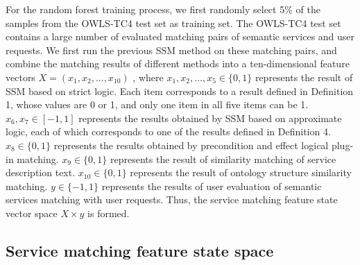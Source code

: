 \documentclass{ieeeaccess}
\begin{document}
For the random forest training process, we first randomly select 5\% of the samples from the OWLS-TC4 test set as training set. The OWLS-TC4 test set contains a large number of evaluated matching pairs of semantic services and user requests. We first run the previous SSM method on these matching pairs, and combine the matching results of different methods into a ten-dimensional feature vectors $X=( {{x}_{1}},{{x}_{2}},...,{{x}_{10}} )$ , where ${{x}_{1}},{{x}_{2}},...,{{x}_{5}}\in \{ 0,1 \}$ represents the result of SSM based on strict logic. Each item corresponds to a result defined in Definition 1, whose values are 0 or 1, and only one item in all five items can be 1. ${{x}_{6}},{{x}_{7}}\in [-1,1]$ represents the results obtained by SSM based on approximate logic, each of which corresponds to one of the results defined in Definition 4. ${{x}_{8}}\in \{ 0,1 \}$ represents the results obtained by precondition and effect logical plug-in matching. ${{x}_{9}}\in \{ 0,1 \}$ represents the result of similarity matching of service description text. ${{x}_{10}}\in \{ 0,1 \}$ represents the result of ontology structure similarity matching. $y\in \{ -1,1 \}$ represents the results of user evaluation of semantic services matching with user requests. Thus, the service matching feature state vector space $X\times y$ is formed.

\subsection{Service matching feature state space}
\end{document}
